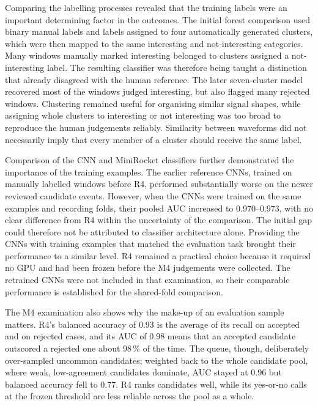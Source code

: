 Comparing the labelling processes revealed that the training labels were an important determining factor in the outcomes. The initial forest comparison used binary manual labels and labels assigned to four automatically generated clusters, which were then mapped to the same interesting and not-interesting categories. Many windows manually marked interesting belonged to clusters assigned a not-interesting label. The resulting classifier was therefore being taught a distinction that already disagreed with the human reference. The later seven-cluster model recovered most of the windows judged interesting, but also flagged many rejected windows. Clustering remained useful for organising similar signal shapes, while assigning whole clusters to interesting or not interesting was too broad to reproduce the human judgements reliably. Similarity between waveforms did not necessarily imply that every member of a cluster should receive the same label.

Comparison of the CNN and MiniRocket classifiers further demonstrated the importance of the training examples. The earlier reference CNNs, trained on manually labelled windows before R4, performed substantially worse on the newer reviewed candidate events. However, when the CNNs were trained on the same examples and recording folds, their pooled AUC increased to 0.970--0.973, with no clear difference from R4 within the uncertainty of the comparison. The initial gap could therefore not be attributed to classifier architecture alone. Providing the CNNs with training examples that matched the evaluation task brought their performance to a similar level. R4 remained a practical choice because it required no GPU and had been frozen before the M4 judgements were collected. The retrained CNNs were not included in that examination, so their comparable performance is established for the shared-fold comparison.

The M4 examination also shows why the make-up of an evaluation sample matters. R4's balanced accuracy of 0.93 is the average of its recall on accepted and on rejected cases, and its AUC of 0.98 means that an accepted candidate outscored a rejected one about 98\,\% of the time. The queue, though, deliberately over-sampled uncommon candidates; weighted back to the whole candidate pool, where weak, low-agreement candidates dominate, AUC stayed at 0.96 but balanced accuracy fell to 0.77. R4 ranks candidates well, while its yes-or-no calls at the frozen threshold are less reliable across the pool as a whole.

